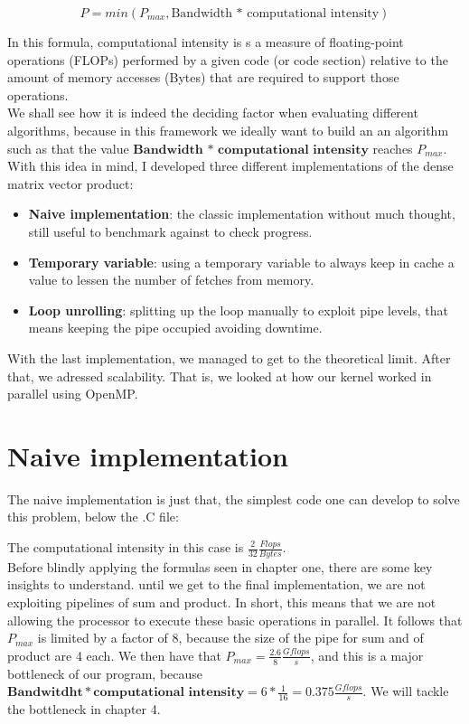 \documentclass[11pt,a4paper,oneside,titlepage,openright]{book}
\begin{document}
$$ P = min(P_{max}, \text{Bandwidth * computational intensity}) $$

In this formula, computational intensity is s a measure of floating-point operations (FLOPs) performed by a given code (or code section) relative to the amount of memory accesses (Bytes) that are required to support those operations. \\
We shall see how it is indeed the deciding factor when evaluating different algorithms, because in this framework we ideally want to build an an algorithm such as that the value $\textbf{Bandwidth * computational intensity}$ reaches $P_{max}$.\\

With this idea in mind, I developed three different implementations of the dense matrix vector product:

\begin{itemize}
\item \textbf{Naive implementation}: the classic implementation without much thought, still useful to benchmark against to check progress. 
\item \textbf{Temporary variable}: using a temporary variable to always keep in cache a value to lessen the number of fetches from memory. 
\item \textbf{Loop unrolling}: splitting up the loop manually to exploit pipe levels, that means keeping the pipe occupied avoiding  downtime. 
\end{itemize}

With the last implementation, we managed to get to the theoretical limit. After that, we adressed scalability. That is, we looked at how our kernel worked in parallel using OpenMP.




\chapter{Naive implementation}

The naive implementation is just that, the simplest code one can develop to solve this problem, below the .C file:

The computational intensity in this case is $\frac{2}{32}\frac{Flops}{Bytes}$. 
\\Before blindly applying the formulas seen in chapter one, there are some key insights to understand. until we get to the final implementation, we are not exploiting pipelines of sum and product. In short, this means that we are not allowing the processor to execute these basic operations in parallel. It follows that $P_{max}$ is limited by a factor of $8$, because the size of the pipe for sum and of product are 4 each.
We then have that $P_{max}= \frac{2.6}{8} \frac{Gflops}{s} $, and this is a major bottleneck of our program, because $\textbf{Bandwitdht} * \textbf{computational intensity} = 6*\frac{1}{16} = 0.375 \frac{Gflops}{s} $. We will tackle the bottleneck in chapter 4.
\end{document}

